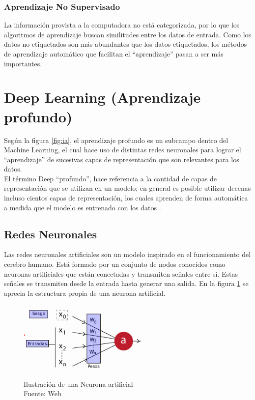 \subsubsection{Aprendizaje No Supervisado}
La información provista a la computadora no está categorizada, por lo que los algoritmos de aprendizaje buscan similitudes entre los datos de entrada. Como los datos no etiquetados son más abundantes que los datos etiquetados, los métodos de aprendizaje automático que facilitan el ``aprendizaje'' pasan a ser más importantes.\

\section{Deep Learning (Aprendizaje profundo)}
Según la figura \ref{fig:ia}, el aprendizaje profundo es un subcampo dentro del Machine Learning, el cual hace uso de distintas redes neuronales para lograr el ``aprendizaje'' de sucesivas capas de representación que son relevantes para los datos.\\

El término Deep ``profundo'', hace referencia a la cantidad de capas de representación que se utilizan en un modelo; en general es posible utilizar decenas incluso cientos capas de representación, los cuales aprenden de forma automática a medida que el modelo es entrenado con los datos \cite{iaarbook:artificialvision}.

\subsection{Redes Neuronales}
Las redes neuronales artificiales son un modelo inspirado en el funcionamiento del cerebro humano. Está formado por un conjunto de nodos conocidos como neuronas artificiales que están conectadas y transmiten señales entre sí. Estas señales se transmiten desde la entrada hasta generar una salida. En la figura \ref{fig:classical_ml} se aprecia la estructura propia de una neurona artificial.\\

\begin{figure}[H]
    \begin{center}
        \includegraphics[width=7cm]{img/capitulo_2/neurona.png}
    \end{center}
    \caption{Ilustración de una Neurona artificial
        \\Fuente: Web}
    \label{fig:classical_ml}
\end{figure}

